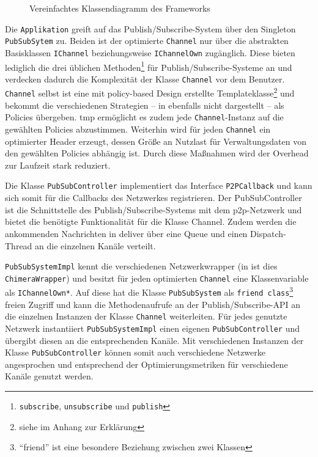 \begin{figure}[htbp]
\centering
{}
\caption{Vereinfachtes Klassendiagramm des Frameworks}
\label{fig:uml}
\end{figure}

Die \texttt{Applikation} greift auf das Publish/Subscribe-System über den Singleton \texttt{PubSub\-Sytem} zu. Beiden ist der optimierte \texttt{Channel} nur über die abstrakten Basisklassen \texttt{IChannel} beziehungsweise \texttt{IChannelOwn} zugänglich. Diese bieten lediglich die drei üblichen Methoden\footnote{\texttt{subscribe}, \texttt{unsubscribe} und \texttt{publish}} für Publish/Subscribe-Systeme an und verdecken dadurch die Komplexität der Klasse \texttt{Channel} vor dem Benutzer. \texttt{Channel} selbst ist eine mit policy-based Design erstellte Templateklasse\footnote{siehe  im Anhang zur Erklärung} und bekommt die verschiedenen Strategien -- in  ebenfalls nicht dargestellt -- als Policies übergeben. \ac{tmp} ermöglicht es zudem jede \texttt{Channel}-Instanz auf die gewählten Policies abzustimmen. Weiterhin wird für jeden \texttt{Channel} ein optimierter Header erzeugt, dessen Größe an Nutzlast für Verwaltungsdaten von den gewählten Policies abhängig ist. Durch diese Maßnahmen wird der Overhead zur Laufzeit stark reduziert. 

Die Klasse \texttt{PubSubController} implementiert das Interface \texttt{P2PCallback} und kann sich somit für die Callbacks des Netzwerkes registrieren. Der PubSubController ist die Schnittstelle des Publish/Subscribe-Systems mit dem \ac{p2p}-Netzwerk und bietet die benötigte Funktionalität für die Klasse Channel. Zudem werden die ankommenden Nachrichten in deliver über eine Queue und einen Dispatch-Thread an die einzelnen Kanäle verteilt. 

\texttt{PubSubSystemImpl} kennt die verschiedenen Netzwerkwrapper (in  ist dies \texttt{ChimeraWrapper}) und besitzt für jeden optimierten \texttt{Channel} eine Klassenvariable als \texttt{IChannelOwn*}. Auf diese hat die Klasse \texttt{PubSubSystem} als \texttt{friend class}\footnote{\enquote{friend} ist eine besondere Beziehung zwischen zwei Klassen} freien Zugriff und kann die Methodenaufrufe an der Publish/Subscribe-API an die einzelnen Instanzen der Klasse \texttt{Channel} weiterleiten. Für jedes genutzte Netzwerk instantiiert \texttt{PubSubSystemImpl} einen eigenen \texttt{PubSubController} und übergibt diesen an die entsprechenden Kanäle. Mit verschiedenen Instanzen der Klasse \texttt{PubSubController} können somit auch verschiedene Netzwerke angesprochen und entsprechend der Optimierungsmetriken für verschiedene Kanäle genutzt werden.

